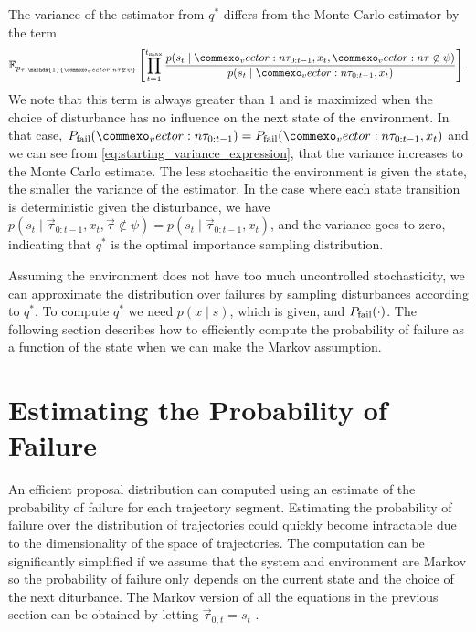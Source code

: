 The variance of the estimator from $q^*$ differs from the Monte Carlo estimator by the term
\begin{equation}
    \mathbb{E}_{p_{\tau \mid \mathds{1} \{\vec{\tau} \not \in \psi\}}}  \left[ \prod_{t=1}^{t_{\rm max}} \frac{p(s_t \mid \vec{\tau}_{0:t-1}, x_t, \vec{\tau} \not \in \psi )}{p(s_t \mid \vec{\tau}_{0:t-1}, x_t)} \right] \text{.}
\end{equation}
We note that this term is always greater than $1$ and is maximized when the choice of disturbance has no influence on the next state of the environment. In that case, $P_{\rm fail}(\vec{\tau}_{0:t-1}) = P_{\rm fail}(\vec{\tau}_{0:t-1}, x_t)$ and we can see from  \cref{eq:starting_variance_expression}, that the variance increases to the Monte Carlo estimate. The less stochasitic the environment is given the state, the smaller the variance of the estimator. In the case where each state transition is deterministic given the disturbance, we have $p(s_t \mid \vec{\tau}_{0:t-1}, x_t, \vec{\tau} \not \in \psi ) = p(s_t \mid \vec{\tau}_{0:t-1}, x_t)$, and the variance goes to zero, indicating that $q^*$ is the optimal importance sampling distribution. 

Assuming the environment does not have too much uncontrolled stochasticity, we can approximate the distribution over failures by sampling disturbances according to $q^*$. To compute $q^*$ we need $p(x \mid s)$, which is given, and $P_{\rm fail}(\cdot)$.  The following section describes how to efficiently compute the probability of failure as a function of the state when we can make the Markov assumption.


\section{Estimating the Probability of Failure}

An efficient proposal distribution can computed using an estimate of the probability of failure for each trajectory segment. Estimating the probability of failure over the distribution of trajectories could quickly become intractable due to the dimensionality of the space of trajectories. The computation can be significantly simplified if we assume that the system and environment are Markov so the probability of failure only depends on the current state and the choice of the next diturbance. The Markov version of all the equations in the previous section can be obtained by letting $\vec{\tau}_{0,t} = s_t$ .

